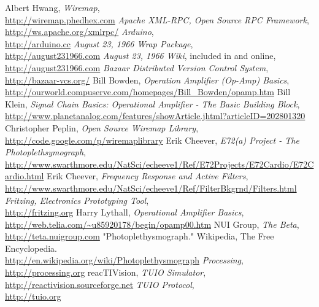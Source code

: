 \begin{thebibliography}{99}%
Albert Hwang, \textsl{Wiremap},
\\ \mbox{}\hfill\url{http://wiremap.phedhex.com}
\textsl{Apache XML-RPC, Open Source RPC Framework},
\\ \mbox{}\hfill\url{http://ws.apache.org/xmlrpc/}
\textsl{Arduino},
\\ \mbox{}\hfill\url{http://arduino.cc}
\textsl{August 23, 1966 Wrap Package},
\\ \mbox{}\hfill\url{http://august231966.com}
\textsl{August 23, 1966 Wiki}, included in \cite{PACK} and online,
\\ \mbox{}\hfill\url{http://august231966.com}
\textsl{Bazaar Distributed Version Control System},
\\ \mbox{}\hfill\url{http://bazaar-vcs.org/}
Bill Bowden, \textsl{Operation Amplifier (Op-Amp) Basics},
\\ \mbox{}\hfill\url{http://ourworld.compuserve.com/homepages/Bill\_Bowden/opamp.htm}
Bill Klein, \textsl{Signal Chain Basics: Operational Amplifier - The Basic Building Block},
\\ \mbox{}\hfill\url{http://www.planetanalog.com/features/showArticle.jhtml?articleID=202801320}
Christopher Peplin, \textsl{Open Source Wiremap Library},
\\ \mbox{}\hfill\url{http://code.google.com/p/wiremaplibrary}
Erik Cheever, \textsl{E72(a) Project - The Photoplethsymograph},
\\ \mbox{}\hfill\url{http://www.swarthmore.edu/NatSci/echeeve1/Ref/E72Projects/E72Cardio/E72Cardio.html}
Erik Cheever, \textsl{Frequency Response and Active Filters},
\\ \mbox{}\hfill\url{http://www.swarthmore.edu/NatSci/echeeve1/Ref/FilterBkgrnd/Filters.html}
\textsl{Fritzing, Electronics Prototyping Tool},
\\ \mbox{}\hfill\url{http://fritzing.org}
Harry Lythall, \textsl{Operational Amplifier Basics},
\\ \mbox{}\hfill\url{http://web.telia.com/~u85920178/begin/opamp00.htm}
NUI Group, \textsl{The Beta},
\\ \mbox{}\hfill\url{http://teta.nuigroup.com}
"Photoplethysmograph." Wikipedia, The Free Encyclopedia.
\\ \mbox{}\hfill\url{http://en.wikipedia.org/wiki/Photoplethysmograph}
\textsl{Processing}, 
\\ \mbox{}\hfill\url{http://processing.org}
reacTIVision, \textsl{TUIO Simulator},
\\ \mbox{}\hfill\url{http://reactivision.sourceforge.net}
\textsl{TUIO Protocol},
\\ \mbox{}\hfill\url{http://tuio.org}
\end{thebibliography}
